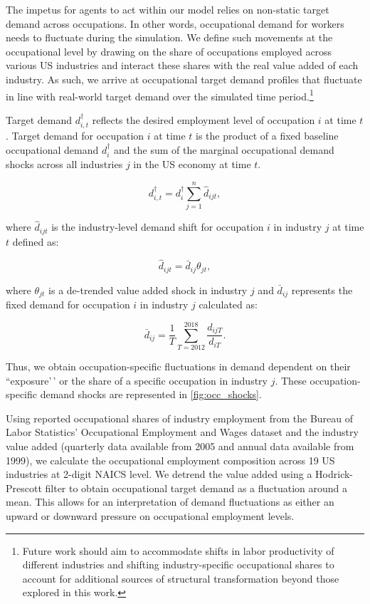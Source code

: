 \documentclass[
]{article}
\author{}
\date{\vspace{-2.5em}}
\begin{document}
The impetus for agents to act within our model relies on non-static
target demand across occupations. In other words, occupational demand
for workers needs to fluctuate during the simulation. We define such
movements at the occupational level by drawing on the share of
occupations employed across various US industries and interact these
shares with the real value added of each industry. As such, we arrive at
occupational target demand profiles that fluctuate in line with
real-world target demand over the simulated time
period.\footnote{Future work should aim to accommodate shifts in labor productivity of different industries and shifting industry-specific occupational shares to account for additional sources of structural transformation beyond those explored in this work.}

Target demand \(d_{i,t}^{\dagger}\) reflects the desired employment
level of occupation \(i\) at time \(t\). Target demand for occupation
\(i\) at time \(t\) is the product of a fixed baseline occupational
demand \(d^{\dagger}_i\) and the sum of the marginal occupational demand
shocks across all industries \(j\) in the US economy at time \(t\).

\[d_{i,t}^{\dagger} =  d^{\dagger}_i\sum_{j=1}^{n} \hat d_{ijt},\]

where \(\hat{d}_{ijt}\) is the industry-level demand shift for
occupation \(i\) in industry \(j\) at time \(t\) defined as:

\[\hat d_{ijt} = \bar d_{ij} \theta_{jt},\]

where \(\theta_{jt}\) is a de-trended value added shock in industry
\(j\) and \(\bar d_{ij}\) represents the fixed demand for occupation
\(i\) in industry \(j\) calculated as:

\[\bar d_{ij} = \frac{1}{T}\sum_{T=2012}^{2018} \frac{d_{ijT}}{d_{iT}}.\]

Thus, we obtain occupation-specific fluctuations in demand dependent on
their ``exposure'\,' or the share of a specific occupation in industry
\(j\). These occupation-specific demand shocks are represented in
\autoref{fig:occ_shocks}.

Using reported occupational shares of industry employment from the
Bureau of Labor Statistics' Occupational Employment and Wages dataset
and the industry value added (quarterly data available from 2005 and
annual data available from 1999), we calculate the occupational
employment composition across 19 US industries at 2-digit NAICS level.
We detrend the value added using a Hodrick-Prescott filter to obtain
occupational target demand as a fluctuation around a mean. This allows
for an interpretation of demand fluctuations as either an upward or
downward pressure on occupational employment levels.
\end{document}
